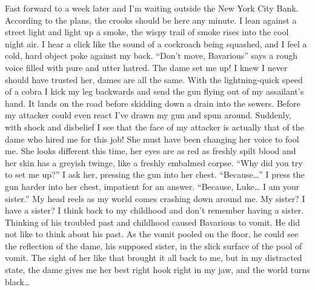 Fast forward to a week later and I'm waiting outside the New York
City Bank. According to the plans, the crooks should be here any
minute. I lean against a street light and light up a smoke, the
wispy trail of smoke rises into the cool night air. I hear a click
like the sound of a cockroach being squashed, and I feel a cold,
hard object poke against my back. ``Don't move, Bavarious'' says a
rough voice filled with pure and utter hatred. The dame set me up!
I knew I never should have trusted her, dames are all the same.
With the lightning-quick speed of a cobra I kick my leg backwards
and send the gun flying out of my assailant's hand. It lands on the
road before skidding down a drain into the sewers. Before my
attacker could even react I've drawn my gun and spun around.
Suddenly, with shock and disbelief I see that the face of my
attacker is actually that of the dame who hired me for this job!
She must have been changing her voice to fool me. She looks
different this time, her eyes are as red as freshly spilt blood and
her skin has a greyish twinge, like a freshly embalmed corpse. ``Why
did you try to set me up?'' I ask her, pressing the gun into her
chest. ``Because{\ldots}'' I press the gun harder into her chest,
impatient for an answer. ``Because, Luke{\ldots} I am your sister.'' My
head reels as my world comes crashing down around me. My sister? I
have a sister? I think back to my childhood and don't remember
having a sister. Thinking of his troubled past and childhood caused
Bavarious to vomit. He did not like to think about his past. As the
vomit pooled on the floor, he could see the reflection of the dame,
his supposed sister, in the slick surface of the pool of vomit. The
sight of her like that brought it all back to me, but in my
distracted state, the dame gives me her best right hook right in my
jaw, and the world turns black{\ldots} 
 



